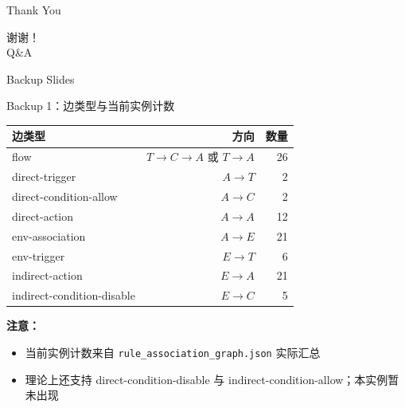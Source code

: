 \documentclass[aspectratio=169,10pt]{beamer}
\begin{document}
\begin{frame}{Thank You}
\begin{center}
  {\LARGE 谢谢！}\\[8pt]
  {\large Q\&A}
\end{center}
\end{frame}

\appendix

\begin{frame}{Backup Slides}
\end{frame}

\begin{frame}{Backup 1：边类型与当前实例计数}
\begin{center}
\small
\begin{tabular}{lrr}
\toprule
边类型 & 方向 & 数量 \\
\midrule
flow & $T\rightarrow C\rightarrow A$ 或 $T\rightarrow A$ & 26 \\
direct-trigger & $A\rightarrow T$ & 2 \\
direct-condition-allow & $A\rightarrow C$ & 2 \\
direct-action & $A\rightarrow A$ & 12 \\
env-association & $A\rightarrow E$ & 21 \\
env-trigger & $E\rightarrow T$ & 6 \\
indirect-action & $E\rightarrow A$ & 21 \\
indirect-condition-disable & $E\rightarrow C$ & 5 \\
\bottomrule
\end{tabular}
\end{center}

\vspace{6pt}
\textbf{注意：}
\begin{itemize}
  \item 当前实例计数来自 \texttt{rule\_association\_graph.json} 实际汇总
  \item 理论上还支持 direct-condition-disable 与 indirect-condition-allow；本实例暂未出现
\end{itemize}
\end{frame}
\end{document}
